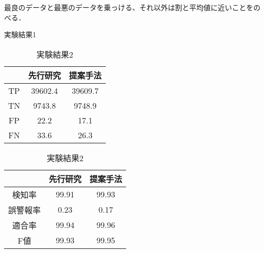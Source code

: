 最良のデータと最悪のデータを乗っける、それ以外は割と平均値に近いことをのべる．
\begin{table}[tb]
  \centering
  \begin{minipage}{0.45\textwidth}  %
      \centering
      \caption{実験結果1}  %
      \begin{tabular}{|c|c|c|}  %
          \hline  %
          ~ &先行研究 & 提案手法\\  %
          \hline  %
          TP & 39602.4 & 39609.7\\  %
          \hline  %
          TN & 9743.8 & 9748.9\\  %
          \hline  %
          FP & 22.2 & 17.1\\  %
          \hline  %
          FN & 33.6 & 26.3\\  %
          \hline  %
      \end{tabular}
      \label{result2}  %
  \end{minipage} \hspace{1cm}  %
  \begin{minipage}{0.45\textwidth}  %
      \centering
      \caption{実験結果2}  %
      \begin{tabular}{|c|c|c|}  %
          \hline  %
          ~ &先行研究 & 提案手法\\  %
          \hline  %
          検知率 & 99.91 & 99.93\\  %
          \hline  %
          誤警報率 & 0.23 & 0.17\\  %
          \hline  %
          適合率 & 99.94 & 99.96\\  %
          \hline  %
          F値 & 99.93 & 99.95\\  %
          \hline  %
      \end{tabular}
      \label{result3}  %
  \end{minipage}
\end{table}
